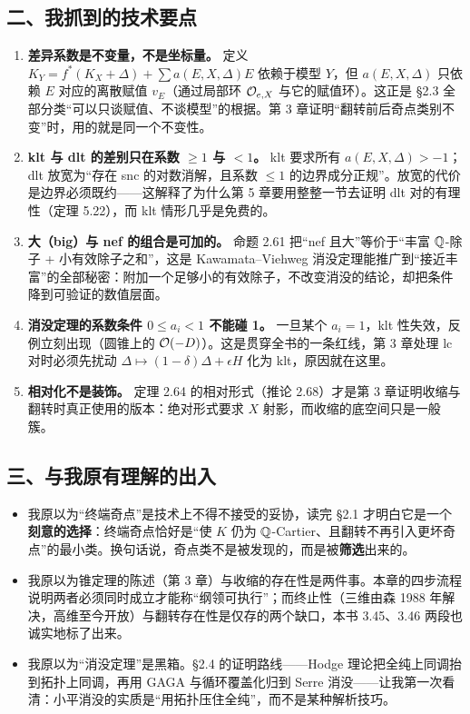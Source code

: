 \subsection*{二、我抓到的技术要点}

\begin{enumerate}
\item \textbf{差异系数是不变量，不是坐标量。} 定义 $K_Y=f^*(K_X+\Delta)+\sum a(E,X,\Delta)E$ 依赖于模型 $Y$，但 $a(E,X,\Delta)$ 只依赖 $E$ 对应的离散赋值 $v_E$（通过局部环 $\mathcal{O}_{e,X}$ 与它的赋值环）。这正是 \S2.3 全部分类“可以只谈赋值、不谈模型”的根据。第 3 章证明“翻转前后奇点类别不变”时，用的就是同一个不变性。
\item \textbf{klt 与 dlt 的差别只在系数 $\ge1$ 与 $<1$。} klt 要求所有 $a(E,X,\Delta)>-1$；dlt 放宽为“存在 snc 的对数消解，且系数 $\le1$ 的边界成分正规”。放宽的代价是边界必须既约——这解释了为什么第 5 章要用整整一节去证明 dlt 对的有理性（定理 5.22），而 klt 情形几乎是免费的。
\item \textbf{大（big）与 nef 的组合是可加的。} 命题 2.61 把“nef 且大”等价于“丰富 $\mathbb{Q}$-除子 + 小有效除子之和”，这是 Kawamata--Viehweg 消没定理能推广到“接近丰富”的全部秘密：附加一个足够小的有效除子，不改变消没的结论，却把条件降到可验证的数值层面。
\item \textbf{消没定理的系数条件 $0\le a_i<1$ 不能碰 1。} 一旦某个 $a_i=1$，klt 性失效，反例立刻出现（圆锥上的 $\mathcal{O}(-D)$）。这是贯穿全书的一条红线，第 3 章处理 lc 对时必须先扰动 $\Delta\mapsto(1-\delta)\Delta+\epsilon H$ 化为 klt，原因就在这里。
\item \textbf{相对化不是装饰。} 定理 2.64 的相对形式（推论 2.68）才是第 3 章证明收缩与翻转时真正使用的版本：绝对形式要求 $X$ 射影，而收缩的底空间只是一般簇。
\end{enumerate}

\subsection*{三、与我原有理解的出入}

\begin{itemize}
\item 我原以为“终端奇点”是技术上不得不接受的妥协，读完 \S2.1 才明白它是一个\textbf{刻意的选择}：终端奇点恰好是“使 $K$ 仍为 $\mathbb{Q}$-Cartier、且翻转不再引入更坏奇点”的最小类。换句话说，奇点类不是被发现的，而是被\textbf{筛选}出来的。
\item 我原以为锥定理的陈述（第 3 章）与收缩的存在性是两件事。本章的四步流程说明两者必须同时成立才能称“纲领可执行”；而终止性（三维由森 1988 年解决，高维至今开放）与翻转存在性是仅存的两个缺口，本书 3.45、3.46 两段也诚实地标了出来。
\item 我原以为“消没定理”是黑箱。\S2.4 的证明路线——Hodge 理论把全纯上同调抬到拓扑上同调，再用 GAGA 与循环覆盖化归到 Serre 消没——让我第一次看清：小平消没的实质是“用拓扑压住全纯”，而不是某种解析技巧。
\end{itemize}

